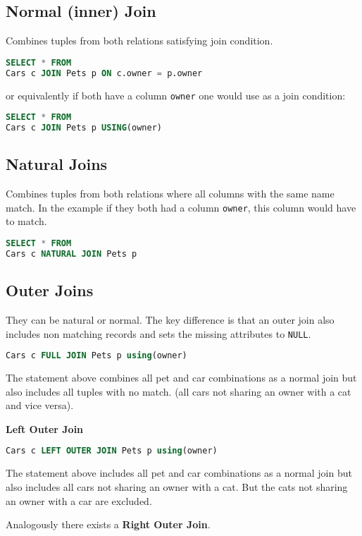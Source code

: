 \documentclass{sciposter}
\renewcommand{\t}[1]{\texttt{#1}}
\begin{document}
\begin{multicols}{3}
\subsection*{Normal (inner) Join}
Combines tuples from both relations satisfying join condition.
\begin{lstlisting}[language=SQL]
SELECT * FROM 
Cars c JOIN Pets p ON c.owner = p.owner
\end{lstlisting}

or equivalently if both have a column \t{owner} one would use as a join condition:

\begin{lstlisting}[language=SQL]
SELECT * FROM 
Cars c JOIN Pets p USING(owner)
\end{lstlisting}

\subsection*{Natural Joins}
Combines tuples from both relations where all columns with the same name match. In the example if they both had a column \t{owner}, this column would have to match.
\begin{lstlisting}[language=SQL]
SELECT * FROM 
Cars c NATURAL JOIN Pets p
\end{lstlisting}


\subsection*{Outer Joins}

They can be natural or normal. The key difference is that an outer join also includes non matching records and sets the missing attributes to \t{NULL}.
\begin{lstlisting}[language=SQL]
Cars c FULL JOIN Pets p using(owner)
\end{lstlisting}
The statement above combines all pet and car combinations as a normal join but also includes all tuples with no match. (all cars not sharing an owner with a cat and vice versa).

\textbf{Left Outer Join}
\begin{lstlisting}[language=SQL]
Cars c LEFT OUTER JOIN Pets p using(owner)
\end{lstlisting}
The statement above includes all pet and car combinations as a normal join but also includes all cars not sharing an owner with a cat. But the cats not sharing an owner with a car are excluded.

Analogously there exists a \textbf{Right Outer Join}.


\end{multicols}
\end{document}
